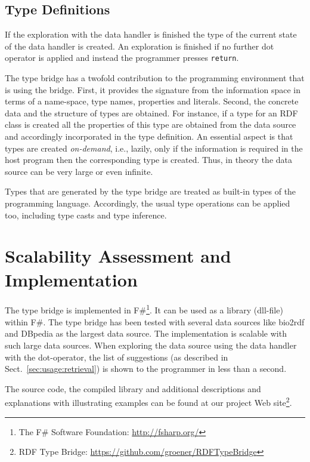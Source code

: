 \documentclass{llncs} %
\newcommand{\fs}{\textsf{F\#}\xspace}
\begin{document}
\subsection{Type Definitions}

If the exploration with the data handler is finished the type of the current state of
the data handler is created. An exploration is finished if no further dot operator is
applied and instead the programmer presses \texttt{return}.

The type bridge has a twofold contribution to the programming
environment that is using the bridge. First, it provides the signature from
the information space in terms of a name-space, type names, properties and literals.
Second, the concrete data and the structure of types are obtained. For instance, if
a type for an RDF class is created all the properties of this type are obtained from the
data source and accordingly incorporated in the type definition. An essential aspect is that types are created \emph{on-demand},
i.e., lazily, only if the information is required in the host program then the corresponding type is created. 
Thus, in theory the data source can be very large or even infinite.

Types that are generated by the type bridge are treated as built-in types of the programming language.
Accordingly, the usual type operations can be applied too, including type casts and type inference.


\section{Scalability Assessment and Implementation}
\label{sec:eval}

The type bridge is implemented in \fs\footnote{The \fs Software Foundation: \url{http://fsharp.org/}}. It can be used as a library (dll-file) within \fs. 
The type bridge has been tested with several data sources like bio2rdf and DBpedia as the largest data source.
The implementation is scalable with such large data sources. When exploring the data
source using the data handler with the dot-operator, the list of suggestions (as described in Sect.~\ref{sec:usage:retrieval})
is shown to the programmer in less than a second.

The source code, the compiled library and additional descriptions
and explanations with illustrating examples can be found at our project Web site\footnote{RDF Type Bridge: \url{https://github.com/groener/RDFTypeBridge}}.
 
\end{document}
